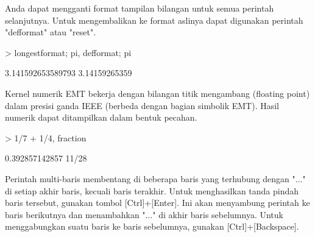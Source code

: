 \documentclass{report}
\begin{document}
\begin{eulernotebook}
\begin{eulercomment}
\begin{eulercomment}
\begin{eulercomment}
Anda dapat mengganti format tampilan bilangan untuk semua perintah
selanjutnya. Untuk mengembalikan ke format aslinya dapat digunakan
perintah "defformat" atau "reset".
\end{eulercomment}
\begin{eulerprompt}
> longestformat; pi, defformat; pi
\end{eulerprompt}
\begin{euleroutput}
  3.141592653589793
  3.14159265359
\end{euleroutput}
\begin{eulercomment}
Kernel numerik EMT bekerja dengan bilangan titik mengambang (floating
point) dalam presisi ganda IEEE (berbeda dengan bagian simbolik EMT).
Hasil numerik dapat ditampilkan dalam bentuk pecahan.
\end{eulercomment}
\begin{eulerprompt}
> 1/7 + 1/4, fraction %
\end{eulerprompt}
\begin{euleroutput}
  0.392857142857
  11/28
\end{euleroutput}
\begin{eulercomment}
Perintah multi-baris membentang di beberapa baris yang terhubung
dengan "..." di setiap akhir baris, kecuali baris terakhir. Untuk
menghasilkan tanda pindah baris tersebut, gunakan tombol
[Ctrl]+[Enter]. Ini akan menyambung perintah ke baris berikutnya dan
menambahkan "..." di akhir baris sebelumnya. Untuk menggabungkan suatu
baris ke baris sebelumnya, gunakan [Ctrl]+[Backspace].


\end{eulercomment}
\end{eulercomment}
\end{eulercomment}
\end{eulernotebook}
\end{document}
